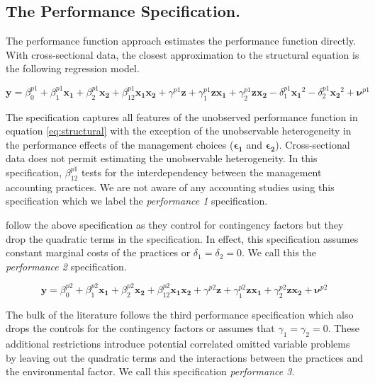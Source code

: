 \documentclass[12pt]{article}
\begin{document}
\subsection{The Performance Specification.}\label{the-performance-specification.}

The performance function approach estimates the performance function
directly. With cross-sectional data, the closest approximation to the
structural equation is the following regression model.

\[
\mathbf{y} = \beta^{p1}_0 + \beta^{p1}_1 \mathbf{x_1} + \beta^{p1}_2 \mathbf{x_2}
  + \beta^{p1}_{12} \mathbf{x_1} \mathbf{x_2} + \gamma^{p1} \mathbf{z} +
  \gamma^{p1}_{1} \mathbf{z} \mathbf{x_1} +
  \gamma^{p1}_{2} \mathbf{z} \mathbf{x_2} -
  \delta^{p1}_1 \mathbf{x_1}^2 - \delta^{p1}_2 \mathbf{x_2}^2  +
  \mathbf{\nu}^{p1}
\]

The specification captures all features of the unobserved performance
function in equation \eqref{eq:structural} with the exception of the
unobservable heterogeneity in the performance effects of the management
choices (\(\mathbf{\epsilon_1}\) and \(\mathbf{\epsilon_2}\)).
Cross-sectional data does not permit estimating the unobservable
heterogeneity. In this specification, \(\beta_{12}^{p1}\) tests for the
interdependency between the management accounting practices. We are not
aware of any accounting studies using this specification which we label
the \emph{performance 1} specification.

\citet{Bedford2016} follow the above specification as they control for
contingency factors but they drop the quadratic terms in the
specification. In effect, this specification assumes constant marginal
costs of the practices or \(\delta_1 = \delta_2 = 0\). We call this the
\emph{performance 2} specification.

\[
\mathbf{y} = \beta^{p2}_0 + \beta^{p2}_1 \mathbf{x_1} + \beta^{p2}_2 \mathbf{x_2}
  + \beta^{p2}_{12} \mathbf{x_1} \mathbf{x_2} + \gamma^{p2} \mathbf{z} +
  \gamma^{p2}_{1} \mathbf{z} \mathbf{x_1} +
  \gamma^{p2}_{2} \mathbf{z} \mathbf{x_2} +
  \mathbf{\nu}^{p2}
\]

The bulk of the literature follows the third performance specification
which also drops the controls for the contingency factors or assumes
that \(\gamma_1 = \gamma_2 = 0\). These additional restrictions
introduce potential correlated omitted variable problems by leaving out
the quadratic terms and the interactions between the practices and the
environmental factor. We call this specification \emph{performance 3}.
\end{document}
